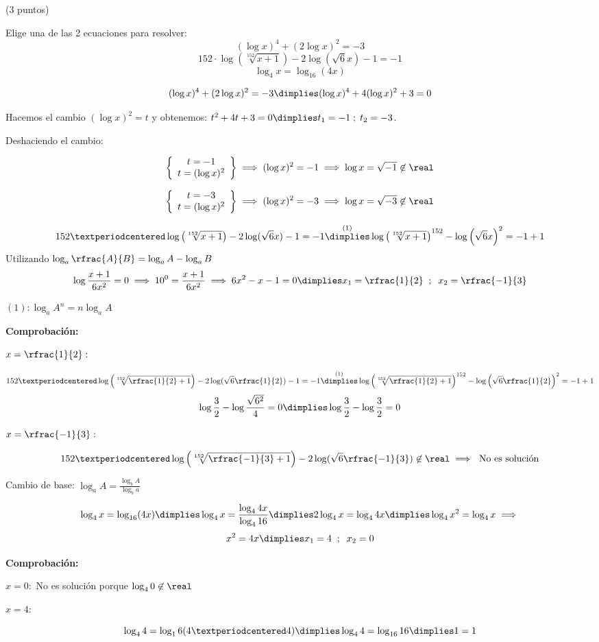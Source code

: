 \documentclass[palatino,nosec]{Docencia}
\begin{document}
\begin{problem}(3 puntos)

Elige una de las 2 ecuaciones para resolver:
\ppart
\[
	(\log x)^4 + (2\log x)^2 = -3
\]
\ppart 
\[
	152·\log\left(\sqrt[152]{x+1}\right) - 2\log(\sqrt{6}x)-1=-1
\]
\ppart 
\[
	\log_4x = \log_{16}(4x)
\]

\solution

\spart
\[
	(\log x)^4 + (2\log x)^2 = -3 \dimplies (\log x)^4 + 4(\log x)^2 + 3 =0
\]

Hacemos el cambio $(\log x)^2 = t$ y obtenemos: $t^2+4t+3 = 0 \dimplies t_1=-1\;;\; t_2=-3$.

Deshaciendo el cambio:

\[
\left\{
\begin{array}{cc}
	t=-1\\
	t=(\log	x)^2
\end{array}
\right\} \implies (\log x)^2 = -1 \implies \log x=\sqrt{-1}\not\in\real
\]

\[
\left\{
\begin{array}{cc}
	t=-3\\
	t=(\log	x)^2
\end{array}
\right\} \implies (\log x)^2 = -3 \implies \log x=\sqrt{-3}\not\in\real
\]

\spart 
\[
	152·\log\left(\sqrt[152]{x+1}\right) - 2\log(\sqrt{6}x)-1=-1 \overset{(1)}{\dimplies} \log\left(\sqrt[152]{x+1}\right)^{152} -  \log\left(\sqrt{6}x\right)^2 = -1+1
\]
Utilizando $\log_a\rfrac{A}{B} = \log_a A - \log_a B$
\[
	\log\frac{x+1}{6x^2}=0 \implies 10^0 = \frac{x+1}{6x^2} \implies 6x^2-x-1 = 0 \dimplies x_1=\rfrac{1}{2} \;\;;\;\;x_2=\rfrac{-1}{3}
\]

$(1): \log_aA^n = n\log_aA$

\textbf{Comprobación:}

$x=\rfrac{1}{2}:$

\[
	152·\log\left(\sqrt[152]{\rfrac{1}{2}+1}\right) - 2\log(\sqrt{6}\rfrac{1}{2})-1=-1 \overset{(1)}{\dimplies} \log\left(\sqrt[152]{\rfrac{1}{2}+1}\right)^{152} -  \log\left(\sqrt{6}\rfrac{1}{2}\right)^2 = -1+1
\]
\[
	\log\frac{3}{2} - \log\frac{\sqrt{6^2}}{4} = 0 \dimplies \log\frac{3}{2} - \log\frac{3}{2} = 0
\]

$x=\rfrac{-1}{3}:$

\[
	152·\log\left(\sqrt[152]{\rfrac{-1}{3}+1}\right) - 2\log(\sqrt{6}\rfrac{-1}{3})\not\in\real\implies \text{ No es solución}
\]

\spart 

Cambio de base: $\log_aA = \frac{\log_bA}{\log_ba}$

\[
	\log_4x = \log_{16}(4x) \dimplies \log_4x = \frac{\log_44x}{\log_416} \dimplies 2\log_4x = \log_44x \dimplies \log_4x^2=\log_4x\implies\]
\[
	x^2=4x \dimplies x_1=4\;\;;\;\;x_2=0
\]

\textbf{Comprobación:}

$x=0:$ No es solución porque $\log_40\not\in\real$

$x=4:$ 

\[
	\log_44 = \log_16(4·4) \dimplies \log_44 = \log_{16}{16} \dimplies 1=1
\]

\end{problem}
\end{document}
